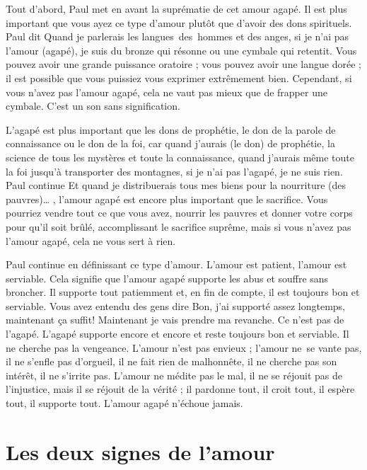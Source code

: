 Tout d'abord, Paul met en avant la suprématie de cet amour agapé.
 Il est plus important que vous ayez ce type d'amour
 plutôt que d'avoir des dons spirituels. Paul dit\frcolon{}
 \Og Quand je parlerais les langues~des~hommes et des anges,
 si je n'ai pas l'amour (agapé), je suis du bronze qui résonne
 ou une cymbale qui retentit. \Fg{}
 Vous pouvez avoir une grande puissance oratoire ;
 vous pouvez avoir une \Og langue dorée \Fg{} ;
 il est possible que vous puissiez vous exprimer extrêmement bien.
 Cependant, si vous n'avez pas l'amour agapé, cela ne vaut pas mieux
 que de frapper une cymbale. C'est un son sans signification.

L'agapé est plus important que les dons de prophétie,
 le don de la parole de connaissance ou le don de la foi,
 car \Og quand j'aurais (le don) de prophétie,
 la science de tous les mystères et toute la connaissance,
 quand j'aurais même toute la foi jusqu'à transporter des montagnes,
 si je n'ai pas l'agapé, je ne suis rien. \Fg{} Paul continue\frcolon{}
 \Og Et quand je distribuerais tous mes biens
 pour la nourriture (des pauvres)\dots{} \Fg{},
 l'amour agapé est encore plus important que le sacrifice.
 Vous pourriez vendre tout ce que vous avez, nourrir les pauvres
 et donner votre corps pour qu'il soit brûlé, accomplissant le sacrifice
 suprême, mais si vous n'avez pas l'amour agapé,
 cela ne vous sert à rien.
 \nowidow[6]
 

Paul continue en définissant ce type d'amour.
 \Og L'amour est patient, l'amour est serviable. \Fg{}
 Cela signifie que l'amour agapé supporte les abus et souffre sans broncher.
 Il supporte tout patiemment et, en fin de compte, il est toujours bon et serviable.
 Vous avez entendu des gens dire\frcolon{}
 \Og Bon, j'ai supporté assez longtemps, maintenant ça suffit!
 Maintenant je vais prendre ma revanche. \Fg{}
 Ce n'est pas de l'agapé. L'agapé supporte encore et encore
 et reste toujours bon et serviable. Il ne cherche pas la vengeance.
 \Og L'amour n'est pas envieux ; l'amour ne~se vante pas,
 il ne s'enfle pas d'orgueil, il ne fait rien de malhonnête,
 il ne cherche pas son intérêt, il ne s'irrite pas.
 L'amour ne médite pas le mal, il ne se réjouit pas de l'injustice,
 mais il se réjouit de la vérité ; il pardonne tout, il croit tout,
 il espère tout, il supporte tout. \Fg{}
 L'amour agapé \Og n'échoue jamais. \Fg{}


\section{Les deux signes de l'amour}

